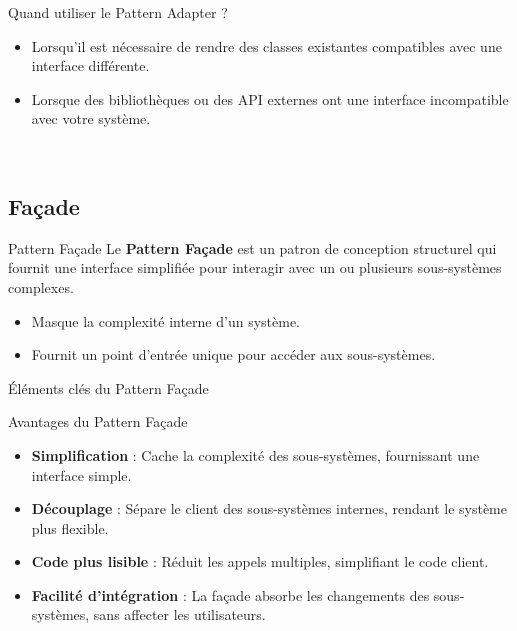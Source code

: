 \documentclass[aspectratio=169]{beamer}
\begin{document}
  \begin{frame}{Quand utiliser le Pattern Adapter ?}
    \begin{itemize}
        \item Lorsqu'il est nécessaire de rendre des classes existantes compatibles avec une interface différente.
        \item Lorsque des bibliothèques ou des API externes ont une interface incompatible avec votre système.
    \end{itemize}
  \end{frame}

  \

  \subsection{Façade}
  \begin{frame}{Pattern Façade}
    Le \textbf{Pattern Façade} est un patron de conception structurel qui fournit une interface simplifiée pour interagir avec un ou plusieurs sous-systèmes complexes. 
    \begin{itemize}
        \item Masque la complexité interne d'un système.
        \item Fournit un point d'entrée unique pour accéder aux sous-systèmes.
    \end{itemize}
  \end{frame}

  \begin{frame}{Éléments clés du Pattern Façade}
  \end{frame}

  \begin{frame}{Avantages du Pattern Façade}
    \begin{itemize}
        \item \textbf{Simplification} : Cache la complexité des sous-systèmes, fournissant une interface simple.
        \item \textbf{Découplage} : Sépare le client des sous-systèmes internes, rendant le système plus flexible.
        \item \textbf{Code plus lisible} : Réduit les appels multiples, simplifiant le code client.
        \item \textbf{Facilité d'intégration} : La façade absorbe les changements des sous-systèmes, sans affecter les utilisateurs.
    \end{itemize}
  \end{frame}
\end{document}
